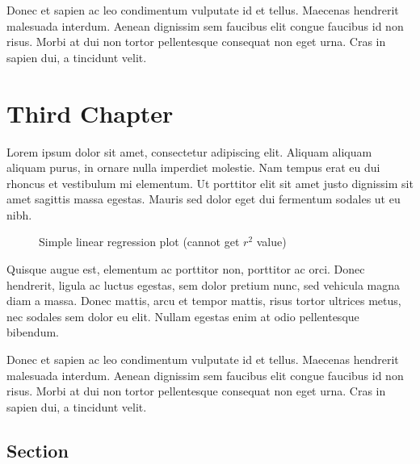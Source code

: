 \documentclass[11pt,a4paper,oneside,article]{memoir}
\begin{document}
Donec et sapien ac leo condimentum vulputate id et tellus. Maecenas hendrerit malesuada interdum. Aenean dignissim sem faucibus elit congue faucibus id non risus. Morbi at dui non tortor pellentesque consequat non eget urna. Cras in sapien dui, a tincidunt velit.

\chapter{Third Chapter}

Lorem ipsum dolor sit amet, consectetur adipiscing elit. Aliquam aliquam aliquam purus, in ornare nulla imperdiet molestie. Nam tempus erat eu dui rhoncus et vestibulum mi elementum. Ut porttitor elit sit amet justo dignissim sit amet sagittis massa egestas. Mauris sed dolor eget dui fermentum sodales ut eu nibh.
\begin{figure}[htbp]
  \centering
\label{fig:stdplot}
\caption{Simple linear regression plot (cannot get $r^2$ value)}
\end{figure}
Quisque augue est, elementum ac porttitor non, porttitor ac orci. Donec hendrerit, ligula ac luctus egestas, sem dolor pretium nunc, sed vehicula magna diam a massa. Donec mattis, arcu et tempor mattis, risus tortor ultrices metus, nec sodales sem dolor eu elit. Nullam egestas enim at odio pellentesque bibendum. 

Donec et sapien ac leo condimentum vulputate id et tellus. Maecenas hendrerit malesuada interdum. Aenean dignissim sem faucibus elit congue faucibus id non risus. Morbi at dui non tortor pellentesque consequat non eget urna. Cras in sapien dui, a tincidunt velit.

\section{Section}
\end{document}
